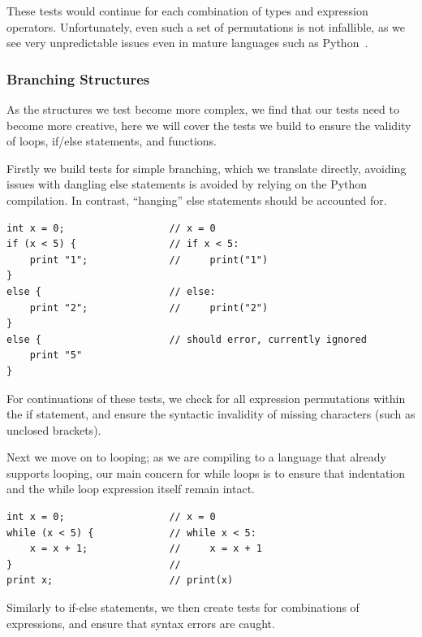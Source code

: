 These tests would continue for each combination of types and expression operators.
Unfortunately, even such a set of permutations is not infallible, as we see very unpredictable issues even in mature
languages such as Python~\cite{PythonIssue}.

\subsubsection{Branching Structures}
As the structures we test become more complex, we find that our tests need to become more creative, here we will
cover the tests we build to ensure the validity of loops, if/else statements, and functions.

Firstly we build tests for simple branching, which we translate directly, avoiding issues with dangling else statements
is avoided by relying on the Python compilation.
In contrast, ``hanging'' else statements should be accounted for.

\begin{lstlisting}[caption={Testing if-else statements},captionpos=b, label={lst:lattice-if-else-test}]
int x = 0;                  // x = 0
if (x < 5) {                // if x < 5:
    print "1";              //     print("1")
}
else {                      // else:
    print "2";              //     print("2")
}
else {                      // should error, currently ignored
    print "5"
}
\end{lstlisting}

For continuations of these tests, we check for all expression permutations within the if statement, and ensure the
syntactic invalidity of missing characters (such as unclosed brackets).

Next we move on to looping; as we are compiling to a language that already supports looping, our main concern for while
loops is to ensure that indentation and the while loop expression itself remain intact.

\begin{lstlisting}[caption={Testing while loops},captionpos=b, label={lst:lattice-while-loop-test}]
int x = 0;                  // x = 0
while (x < 5) {             // while x < 5:
    x = x + 1;              //     x = x + 1
}                           //
print x;                    // print(x)
\end{lstlisting}

Similarly to if-else statements, we then create tests for combinations of expressions, and ensure that syntax errors
are caught.


